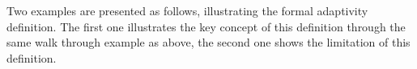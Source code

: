 Two examples are presented as follows, illustrating the formal adaptivity definition.
The first one illustrates the key concept of this definition through the same walk through example as above,
the second one shows the limitation of this definition.

